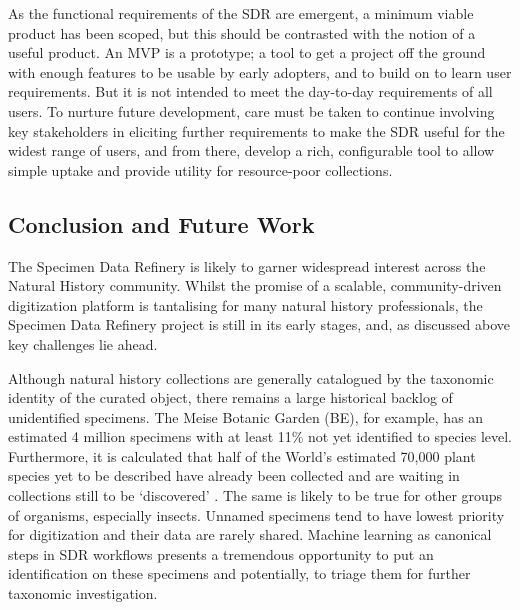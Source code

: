 As the functional requirements of the SDR are emergent, a minimum viable
product has been scoped, but this should be contrasted with the notion
of a useful product. An MVP is a prototype; a tool to get a project off
the ground with enough features to be usable by early adopters, and to
build on to learn user requirements. But it is not intended to meet the
day-to-day requirements of all users. To nurture future development,
care must be taken to continue involving key stakeholders in eliciting
further requirements to make the SDR useful for the widest range of
users, and from there, develop a rich, configurable tool to allow simple
uptake and provide utility for resource-poor collections.

\hypertarget{conclusion-and-future-work}{%
\subsection{Conclusion and Future
Work}\label{conclusion-and-future-work}}

The Specimen Data Refinery is likely to garner widespread interest
across the Natural History community. Whilst the promise of a scalable,
community-driven digitization platform is tantalising for many natural
history professionals, the Specimen Data Refinery project is still in
its early stages, and, as discussed above key challenges lie ahead.

Although natural history collections are generally catalogued by the
taxonomic identity of the curated object, there remains a large
historical backlog of unidentified specimens. The Meise Botanic Garden
(BE), for example, has an estimated 4 million specimens with at least
11\% not yet identified to species level. Furthermore, it is calculated
that half of the World's estimated 70,000 plant species yet to be
described have already been collected and are waiting in collections
still to be `discovered' \cite{Crusoe 2022}. The same is likely to be true for
other groups of organisms, especially insects. Unnamed specimens tend to
have lowest priority for digitization and their data are rarely shared.
Machine learning as canonical steps in SDR workflows presents a
tremendous opportunity to put an identification on these specimens and
potentially, to triage them for further taxonomic investigation.


